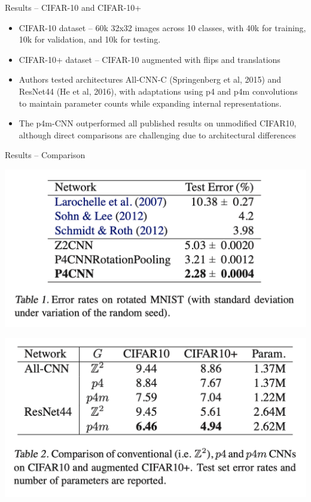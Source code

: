 \documentclass{beamer}
\begin{document}
\begin{frame}{Results -- CIFAR-10 and CIFAR-10+}
    \begin{itemize}
        \item CIFAR-10 dataset -- 60k 32x32 images across 10 classes, with 40k for training, 10k for validation, and 10k for testing.
        \item CIFAR-10+ dataset -- CIFAR-10 augmented with flips and translations
        \item Authors tested architectures  All-CNN-C  (Springenberg et al, 2015) and ResNet44 (He et al, 2016), with adaptations using p4 and p4m convolutions to maintain parameter counts while expanding internal representations.
        \item The p4m-CNN outperformed all published results on unmodified CIFAR10, although direct comparisons are challenging due to architectural differences 
      \end{itemize}
\end{frame} 

\begin{frame}{Results -- Comparison}
    \begin{minipage}{0.5\textwidth}
        \includegraphics[width=\linewidth]{Screenshot 2024-01-13 at 11.28.16 AM.png} %
    \end{minipage}%
    \begin{minipage}{0.5\textwidth}
        \includegraphics[width=\linewidth]{Screenshot 2024-01-13 at 11.28.27 AM.png} %
    \end{minipage}
\end{frame}
\end{document}
